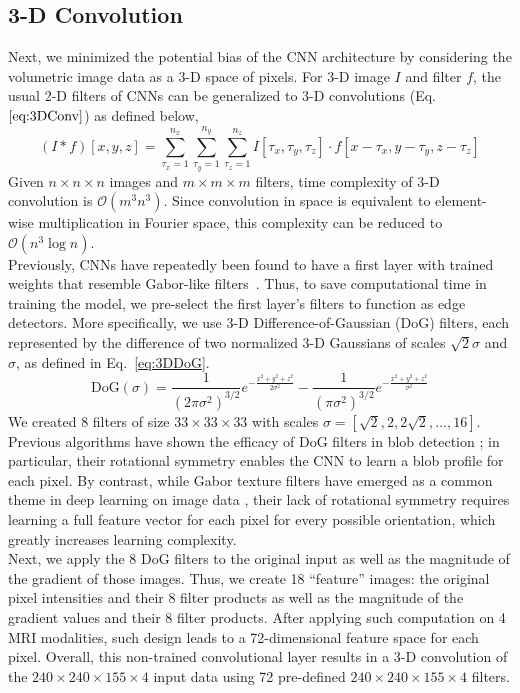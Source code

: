 \documentclass{llncs}
\begin{document}
\subsection{3-D Convolution}
Next, we minimized the potential bias of the CNN architecture by considering the volumetric image data as a 3-D space of pixels. For 3-D image $I$ and filter $f$, the usual 2-D filters of CNNs can be generalized to 3-D convolutions (Eq.~$\ref{eq:3DConv}$) as defined below,
\begin{equation}\label{eq:3DConv}
(I * f) [x,y,z] = \sum_{\tau_x = 1}^{n_x} \sum_{\tau_y = 1}^{n_y} \sum_{\tau_z = 1}^{n_z}  I[\tau_x, \tau_y, \tau_z] \cdot f[x - \tau_x, y - \tau_y, z - \tau_z]
\end{equation} %
Given $n \times n \times n$ images and $m \times m \times m$ filters, time complexity of 3-D convolution is $\mathcal{O} (m^3 n^3)$. Since convolution in space is equivalent to element-wise multiplication in Fourier space, this complexity can be reduced to $\mathcal{O} \left(n^3 \log n \right)$. \\
\indent Previously, CNNs have repeatedly been found to have a first layer with trained weights that resemble Gabor-like filters~\cite{Yosinski14}.  Thus, to save computational time in training the model, we pre-select the first layer's filters to function as edge detectors. More specifically, we use 3-D Difference-of-Gaussian (DoG) filters, each represented by the difference of two normalized 3-D Gaussians of scales $\sqrt{2} \sigma$ and $\sigma$, as defined in Eq.~\ref{eq:3DDoG}.
\begin{equation}\label{eq:3DDoG}
\text{DoG} (\sigma) = \frac{1}{(2 \pi \sigma^2)^{3/2}} e^{-\frac{x^2 + y^2 + z^2}{2 \sigma^2}} - \frac{1}{(\pi \sigma^2)^{3/2}} e^{-\frac{x^2 + y^2 + z^2}{\sigma^2}}
\end{equation}
We created 8 filters of size $33 \times 33 \times 33$ with scales $\sigma = [\sqrt{2}, 2, 2 \sqrt{2}, \dots, 16]$.  Previous algorithms have shown the efficacy of DoG filters in blob detection \cite{sift}; in particular, their rotational symmetry enables the CNN to learn a blob profile for each pixel.  By contrast, while Gabor texture filters have emerged as a common theme in deep learning on image data \cite{Krizhevsky12}, their lack of rotational symmetry requires learning a full feature vector for each pixel for every possible orientation, which greatly increases learning complexity. \\
\indent Next, we apply the 8 DoG filters to the original input as well as the magnitude of the gradient of those images. Thus, we create 18 ``feature'' images: the original pixel intensities and their 8 filter products as well as the magnitude of the gradient values and their 8 filter products. After applying such computation on 4 MRI modalities, such design leads to a 72-dimensional feature space for each pixel. Overall, this non-trained convolutional layer results in a 3-D convolution of the $240 \times 240 \times 155 \times 4$ input data using 72 pre-defined $240 \times 240 \times 155 \times 4$ filters.
\end{document}
